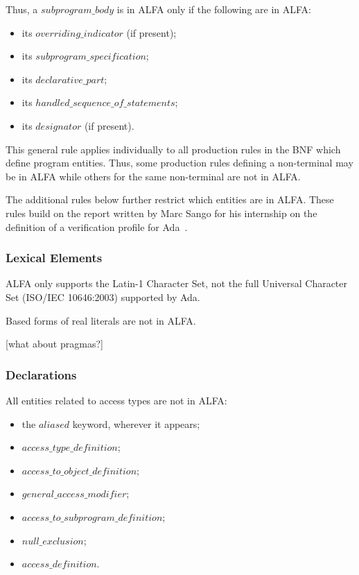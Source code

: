\documentclass[fullpage]{article}
\newcommand{\bnf}[1]{$\mathit{#1}$}
\begin{document}
Thus, a \bnf{subprogram\_body} is in ALFA only if the following are in ALFA:
\begin{itemize}
\item its \bnf{overriding\_indicator} (if present);
\item its \bnf{subprogram\_specification};
\item its \bnf{declarative\_part};
\item its \bnf{handled\_sequence\_of\_statements};
\item its \bnf{designator} (if present).
\end{itemize}

This general rule applies individually to all production rules in the BNF
which define program entities. Thus, some production rules defining a
non-terminal may be in ALFA while others for the same non-terminal are not in
ALFA.

The additional rules below further restrict which entities are in ALFA. These
rules build on the report written by Marc Sango for his internship on the
definition of a verification profile for Ada~\cite{Sango2010RR}. 

\subsubsection{Lexical Elements}

ALFA only supports the Latin-1 Character Set, not the full Universal Character
Set (ISO/IEC 10646:2003) supported by Ada.

Based forms of real literals are not in ALFA.

[what about pragmas?]

\subsubsection{Declarations}

All entities related to access types are not in ALFA:
\begin{itemize}
\item the \bnf{aliased} keyword, wherever it appears;
\item \bnf{access\_type\_definition};
\item \bnf{access\_to\_object\_definition};
\item \bnf{general\_access\_modifier};
\item \bnf{access\_to\_subprogram\_definition};
\item \bnf{null\_exclusion};
\item \bnf{access\_definition}.
\end{itemize}
\end{document}
